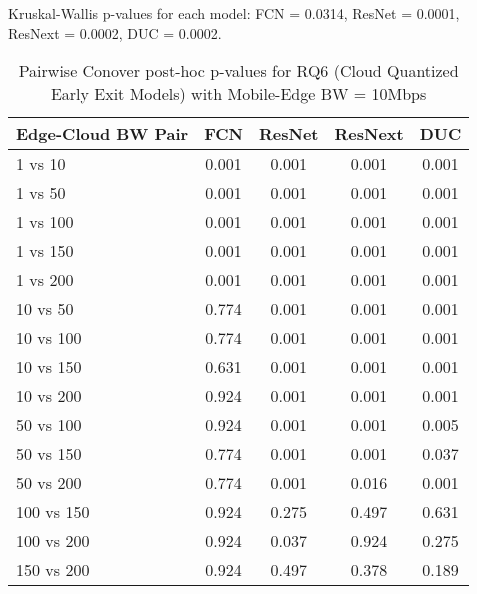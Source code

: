 \begin{table}[h]
\centering
\caption{Pairwise Conover post-hoc p-values for RQ6 (Cloud Quantized Early Exit Models) with Mobile-Edge BW = 10Mbps}
\label{tab:conover_cloud_quantized_earlyexit_me10}
\smallskip
Kruskal-Wallis p-values for each model: FCN = 0.0314, ResNet = 0.0001, ResNext = 0.0002, DUC = 0.0002.

\begin{tabular}{lcccc}
\toprule
Edge-Cloud BW Pair & FCN & ResNet & ResNext & DUC \\
\midrule
1 vs 10 & 0.001 & 0.001 & 0.001 & 0.001 \\
1 vs 50 & 0.001 & 0.001 & 0.001 & 0.001 \\
1 vs 100 & 0.001 & 0.001 & 0.001 & 0.001 \\
1 vs 150 & 0.001 & 0.001 & 0.001 & 0.001 \\
1 vs 200 & 0.001 & 0.001 & 0.001 & 0.001 \\
10 vs 50 & 0.774 & 0.001 & 0.001 & 0.001 \\
10 vs 100 & 0.774 & 0.001 & 0.001 & 0.001 \\
10 vs 150 & 0.631 & 0.001 & 0.001 & 0.001 \\
10 vs 200 & 0.924 & 0.001 & 0.001 & 0.001 \\
50 vs 100 & 0.924 & 0.001 & 0.001 & 0.005 \\
50 vs 150 & 0.774 & 0.001 & 0.001 & 0.037 \\
50 vs 200 & 0.774 & 0.001 & 0.016 & 0.001 \\
100 vs 150 & 0.924 & 0.275 & 0.497 & 0.631 \\
100 vs 200 & 0.924 & 0.037 & 0.924 & 0.275 \\
150 vs 200 & 0.924 & 0.497 & 0.378 & 0.189 \\
\bottomrule
\end{tabular}
\end{table}

